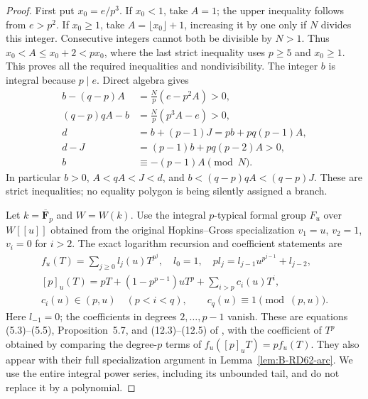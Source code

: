 \begin{proof}
First put $x_0=e/p^3$. If $x_0<1$, take $A=1$; the upper
inequality follows from $e>p^2$. If $x_0\ge1$, take
$A=\lfloor x_0\rfloor+1$, increasing it by one only if
$N$ divides this integer. Consecutive integers cannot both
be divisible by $N>1$. Thus $x_0<A\le x_0+2<px_0$,
where the last strict inequality uses $p\ge5$ and $x_0\ge1$.
This proves all the required inequalities and nondivisibility.
The integer $b$ is integral because $p\mid e$. Direct algebra gives
\[
\begin{split}
 b-(q-p)A&=\frac Np(e-p^2A)>0,\\
 (q-p)qA-b&=\frac Np(p^3A-e)>0,\\
 d&=b+(p-1)J=pb+pq(p-1)A,\\
 d-J&=(p-1)b+pq(p-2)A>0,\\
 b&\equiv-(p-1)A\pmod N .
\end{split}                                             \tag{B-RD100.2}
\]
In particular $b>0$, $A<qA<J<d$, and
$b<(q-p)qA<(q-p)J$. These are strict inequalities;
no equality polygon is being silently assigned a branch.

Let $k=\overline{\mathbf F}_p$ and $W=W(k)$. Use the
integral $p$-typical formal group $F_u$ over $W[[u]]$
obtained from the original Hopkins--Gross specialization
$v_1=u$, $v_2=1$, $v_i=0$ for $i>2$.
The exact logarithm recursion and coefficient statements are
\[
\begin{gathered}
 f_u(T)=\sum_{j\ge0}l_j(u)T^{p^j},\quad l_0=1,\quad
 p l_j=l_{j-1}u^{p^{j-1}}+l_{j-2},\\
 [p]_u(T)=pT+(1-p^{p-1})uT^p+\sum_{i>p}c_i(u)T^i,\\
 c_i(u)\in(p,u)\quad(p<i<q),\qquad
 c_q(u)\equiv1\pmod{(p,u)}.
\end{gathered}                                           \tag{B-RD100.3}
\]
Here $l_{-1}=0$; the coefficients in degrees $2,\ldots,p-1$
vanish. These are equations (5.3)--(5.5), Proposition~5.7,
and (12.3)--(12.5) of \cite{HopkinsGross1994Bundles}, with
the coefficient of $T^p$ obtained by comparing the degree-$p$
terms of $f_u([p]_uT)=pf_u(T)$. They also appear with their
full specialization argument in Lemma~\ref{lem:B-RD62-arc}.
We use the entire integral power series, including its
unbounded tail, and do not replace it by a polynomial.


\end{proof}
